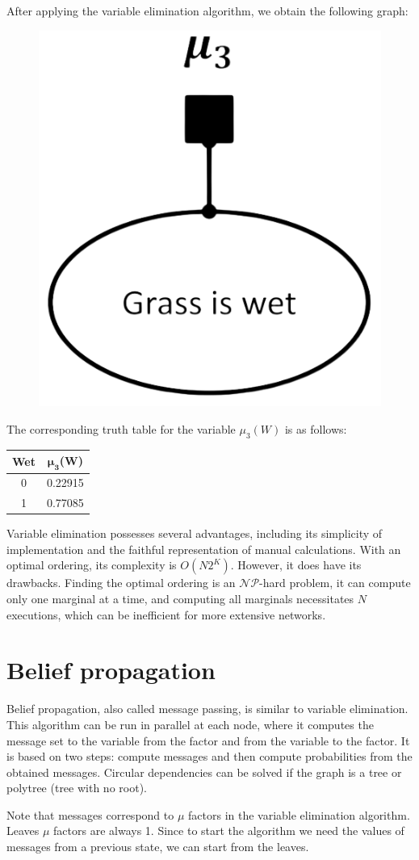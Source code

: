 \documentclass[12pt, a4paper]{report}
\begin{document}
\begin{example}
\begin{figure}[H]
        \end{figure} 
        After applying the variable elimination algorithm, we obtain the following graph:
        \begin{figure}[H]
            \centering
            \includegraphics[width=0.15\linewidth]{images/fg1.png}
        \end{figure} 
        The corresponding truth table for the variable $\mu_3(W)$ is as follows:
        \begin{table}[H]
            \centering
            \begin{tabular}{cc}
            \hline
            \textbf{Wet} & \textbf{$\boldsymbol{\mu_3}$(W)} \\ \hline
            0      & 0.22915  \\
            1      & 0.77085  \\ \hline
            \end{tabular}
        \end{table}
    \end{example}
    Variable elimination possesses several advantages, including its simplicity of implementation and the faithful representation of manual calculations. 
    With an optimal ordering, its complexity is $O(N2^K)$.
    However, it does have its drawbacks. 
    Finding the optimal ordering is an $\mathcal{NP}$-hard problem, it can compute only one marginal at a time, and computing all marginals necessitates $N$ executions, which can be inefficient for more extensive networks.

    \section{Belief propagation}
    Belief propagation, also called message passing, is similar to variable elimination. 
    This algorithm can be run in parallel at each node, where it computes the message set to the variable from the factor and from the variable to the factor. 
    It is based on two steps: compute messages and then compute probabilities from the obtained messages. 
    Circular dependencies can be solved if the graph is a tree or polytree (tree with no root). 

    Note that messages correspond to $\mu$ factors in the variable elimination algorithm. 
    Leaves $\mu$ factors are always 1.
    Since to start the algorithm we need the values of messages from a previous state, we can start from the leaves. 
\end{document}

